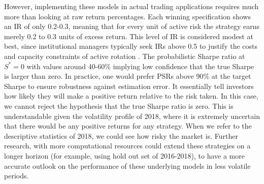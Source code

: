 However, implementing these models in actual trading applications requires much more than looking at raw return percentages. Each winning specification shows an IR of only 0.2-0.3, meaning that for every unit of active risk the strategy earns merely 0.2 to 0.3 units of excess return. This level of IR is considered modest at best, since institutional managers typically seek IRs above 0.5 to justify the costs and capacity constraints of active rotation \cite{gratton_2025}. The probabilistic Sharpe ratio at $S^{*} = 0$  with values around 40-60\% implying low confidence that the true Sharpe is larger than zero. In practice, one would prefer PSRs above 90\% at the target Sharpe to ensure robustness against estimation error. It essentially tell investors how likely they will make a positive return relative to the risk taken. In this case, we cannot reject the hypothesis that the true Sharpe ratio is zero. This is understandable given the volatility profile of 2018, where it is extremely uncertain that there would be any positive returns for any strategy. When we refer to the descriptive statistics of 2018, we could see how risky the market is.  Further research, with more computational resources could extend these strategies on a longer horizon (for example, using hold out set of 2016-2018), to have a more accurate outlook on the performance of these underlying models in less volatile periods.




